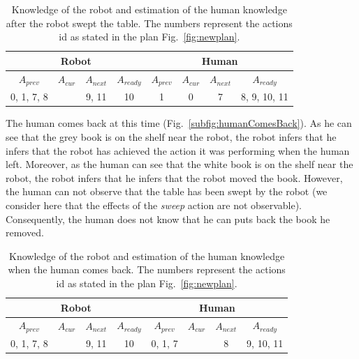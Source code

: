 \documentclass[english,a4paper,11pt,twoside]{StyleThese}
\begin{document}
\begin{table}[!h]
\begin{center}
\begin{tabular}{|c|c|c|c||c|c|c|c|}
\hline
\multicolumn{4}{|c||}{Robot} & \multicolumn{4}{c|}{Human}\\
\hline
$A_{prev}$ & $A_{cur}$ & $A_{next}$ & $A_{ready}$ & $A_{prev}$ & $A_{cur}$ & $A_{next}$ & $A_{ready}$\\
\hline
\hline
0, 1, 7, 8  &  & 9, 11 & 10 & 1 & 0 & 7 & 8, 9, 10, 11\\
\hline
\end{tabular}
\end{center}
\caption{Knowledge of the robot and estimation of the human knowledge after the robot swept the table. The numbers represent the actions id as stated in the plan Fig.~\ref{fig:newplan}.}
\label{table:results}
\end{table}

The human comes back at this time (Fig.~\ref{subfig:humanComesBack}). As he can see that the grey book is on the shelf near the robot, the robot infers that he infers that the robot has achieved the action it was performing when the human left. Moreover, as the human can see that the white book is on the shelf near the robot, the robot infers that he infers that the robot moved the book. However, the human can not observe that the table has been swept by the robot (we consider here that the effects of the \textit{sweep} action are not observable). Consequently, the human does not know that he can puts back the book he removed.

\begin{table}[!h]
\begin{center}
\begin{tabular}{|c|c|c|c||c|c|c|c|}
\hline
\multicolumn{4}{|c||}{Robot} & \multicolumn{4}{c|}{Human}\\
\hline
$A_{prev}$ & $A_{cur}$ & $A_{next}$ & $A_{ready}$ & $A_{prev}$ & $A_{cur}$ & $A_{next}$ & $A_{ready}$\\
\hline
\hline
0, 1, 7, 8  &  & 9, 11 & 10 & 0, 1, 7 &  & 8 & 9, 10, 11\\
\hline
\end{tabular}
\end{center}
\caption{Knowledge of the robot and estimation of the human knowledge when the human comes back. The numbers represent the actions id as stated in the plan Fig.~\ref{fig:newplan}.}
\label{table:results}
\end{table}
\end{document}
